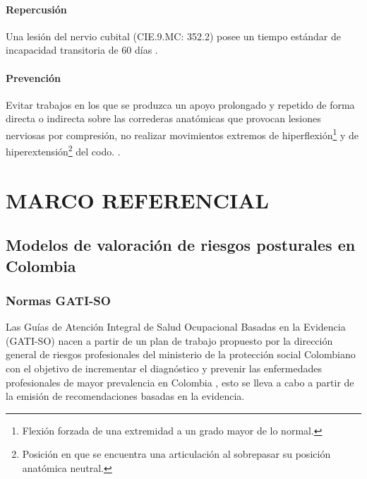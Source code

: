 \paragraph{Repercusión}
Una lesión del nervio cubital (CIE.9.MC: 352.2) posee un tiempo estándar de incapacidad transitoria de 60 días \parencite[6]{INSHT2017SindromeCodo}.
\paragraph{Prevención}
Evitar trabajos en los que se produzca un apoyo prolongado y repetido de forma directa o indirecta sobre las correderas anatómicas que provocan lesiones nerviosas por compresión, no realizar movimientos extremos de hiperflexión\footnote{Flexión forzada de una extremidad a un grado mayor de lo normal.} y de hiperextensión\footnote{Posición en que se encuentra una articulación al sobrepasar su posición anatómica neutral.} del codo. \parencite[5]{INSHT2017SindromeCodo}.


\section{MARCO REFERENCIAL}
\subsection{Modelos de valoración de riesgos posturales en Colombia}
\subsubsection{Normas GATI-SO}
Las Guías de Atención Integral de Salud Ocupacional Basadas en la Evidencia (GATI-SO) nacen a partir de un plan de trabajo propuesto por la dirección general de riesgos profesionales del ministerio de la protección social Colombiano con el objetivo de incrementar el diagnóstico y prevenir las enfermedades profesionales de
mayor prevalencia en Colombia \parencite[6]{MinisteriodeProteccionSocialdeColombia2006GuiaSuperiores}, esto se lleva a cabo a partir de la emisión de recomendaciones basadas en la evidencia.

